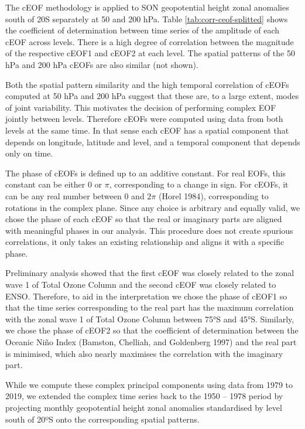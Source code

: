 \documentclass[smallextended]{svjour3}       %
\begin{document}
The cEOF methodology is applied to SON geopotential height zonal anomalies south of 20\degree S separately at 50 and 200 hPa.
Table \ref{tab:corr-ceof-splitted} shows the coefficient of determination between time series of the amplitude of each cEOF across levels.
There is a high degree of correlation between the magnitude of the respective cEOF1 and cEOF2 at each level.
The spatial patterns of the 50 hPa and 200 hPa cEOFs are also similar (not shown).

Both the spatial pattern similarity and the high temporal correlation of cEOFs computed at 50 hPa and 200 hPa suggest that these are, to a large extent, modes of joint variability.
This motivates the decision of performing complex EOF jointly between levels.
Therefore cEOFs were computed using data from both levels at the same time.
In that sense each cEOF has a spatial component that depends on longitude, latitude and level, and a temporal component that depends only on time.

The phase of cEOFs is defined up to an additive constant.
For real EOFs, this constant can be either 0 or \(\pi\), corresponding to a change in sign.
For cEOFs, it can be any real number between 0 and \(2\pi\) (Horel 1984), corresponding to rotations in the complex plane.
Since any choice is arbitrary and equally valid, we chose the phase of each cEOF so that the real or imaginary parts are aligned with meaningful phases in our analysis.
This procedure does not create spurious correlations, it only takes an existing relationship and aligns it with a specific phase.

Preliminary analysis showed that the first cEOF was closely related to the zonal wave 1 of Total Ozone Column and the second cEOF was closely related to ENSO.
Therefore, to aid in the interpretation we chose the phase of cEOF1 so that the time series corresponding to the real part has the maximum correlation with the zonal wave 1 of Total Ozone Column between 75°S and 45°S.
Similarly, we chose the phase of cEOF2 so that the coefficient of determination between the Oceanic Niño Index (Bamston, Chelliah, and Goldenberg 1997) and the real part is minimised, which also nearly maximises the correlation with the imaginary part.

While we compute these complex principal components using data from 1979 to 2019, we extended the complex time series back to the 1950 -- 1978 period by projecting monthly geopotential height zonal anomalies standardised by level south of 20ºS onto the corresponding spatial patterns.
\end{document}

